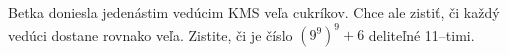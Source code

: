 \createTaskHeader
Betka doniesla jedenástim vedúcim KMS veľa cukríkov. Chce ale zistiť, či každý vedúci dostane rovnako veľa.
Zistite, či je číslo $(9^9)^9 + 6$ deliteľné 11--timi.